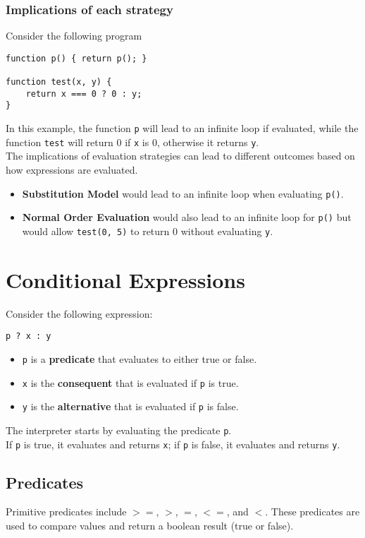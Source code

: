 \documentclass{notes}
\begin{document}
\subsubsection{Implications of each strategy}
Consider the following program
\begin{verbatim}
function p() { return p(); }

function test(x, y) {
    return x === 0 ? 0 : y;
}
\end{verbatim}
In this example, the function \texttt{p} will lead to an infinite loop if evaluated, while the function \texttt{test} will return 0 if \texttt{x} is 0, otherwise it returns \texttt{y}. \\
The implications of evaluation strategies can lead to different outcomes based on how expressions are evaluated.

\begin{itemize}
    \item \textbf{Substitution Model} would lead to an infinite loop when evaluating \texttt{p()}.
    \item \textbf{Normal Order Evaluation} would also lead to an infinite loop for \texttt{p()} but would allow \texttt{test(0, 5)} to return 0 without evaluating \texttt{y}.
\end{itemize}

\section{Conditional Expressions}
Consider the following expression:
\begin{verbatim}
p ? x : y
\end{verbatim}
\begin{itemize}
    \item \texttt{p} is a \textbf{predicate} that evaluates to either true or false.
    \item \texttt{x} is the \textbf{consequent} that is evaluated if \texttt{p} is true.
    \item \texttt{y} is the \textbf{alternative} that is evaluated if \texttt{p} is false.
\end{itemize}
The interpreter starts by evaluating the predicate \texttt{p}. \\ 
If \texttt{p} is true, it evaluates and returns \texttt{x}; if \texttt{p} is false, it evaluates and returns \texttt{y}. 

\subsection{Predicates}
Primitive predicates include \(>=\), \(>\), \(=\), \(<=\), and \(<\). These predicates are used to compare values and return a boolean result (true or false).
\end{document}
